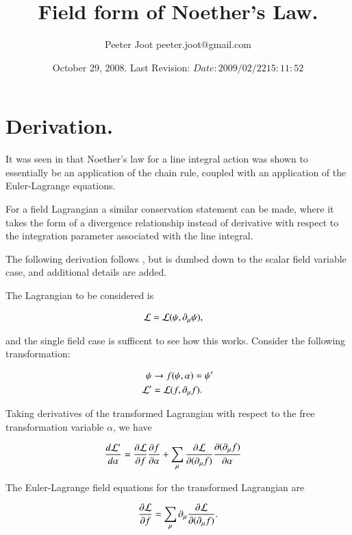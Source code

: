 \documentclass{article}
\title{Field form of Noether's Law.}
\author{Peeter Joot \quad peeter.joot@gmail.com}
\date{ October 29, 2008.  Last Revision: $Date: 2009/02/22 15:11:52 $ }
\begin{document}
\maketitle{}
\tableofcontents

\section{ Derivation. }

It was seen in 
\cite{PJEulerLagrange} 
that Noether's law for a line integral action was shown
to essentially be an application of the chain rule, coupled with
an application of the Euler-Lagrange equations.

For a field Lagrangian a similar conservation statement can be made, where
it takes the form of a divergence relationship instead of derivative
with respect to the integration parameter associated with the line integral.

The following derivation follows \cite{doran2003gap}, but is dumbed down to the scalar field variable case, and
additional details are added.

The Lagrangian to be considered is

\begin{align*}
\mathcal{L} &= \mathcal{L}(\psi, \partial_\mu \psi),
\end{align*}

and the single field case is sufficent to see how this works.  Consider the following transformation:

\begin{align*}
\psi &\rightarrow f(\psi, \alpha) = \psi' \\
\mathcal{L}' &= \mathcal{L}(f, \partial_\mu f).
\end{align*}

Taking derivatives of the transformed Lagrangian with respect to the free transformation variable $\alpha$, we have

\begin{align}\label{eqn:noetherschain}
\frac{d\mathcal{L}'}{d\alpha}
&= \frac{\partial {\mathcal{L}}}{\partial {f}}\frac{\partial {f}}{\partial {\alpha}} + \sum_\mu \frac{\partial {\mathcal{L}}}{\partial {(\partial_\mu f)}}\frac{\partial {(\partial_\mu f)}}{\partial {\alpha}}
\end{align}

The Euler-Lagrange field equations for the transformed Lagrangian are

\begin{align}\label{eqn:eulerLag}
\frac{\partial {\mathcal{L}}}{\partial {f}} = \sum_\mu \partial_\mu \frac{\partial {\mathcal{L}}}{\partial {(\partial_\mu f)}}.
\end{align}
\end{document}
